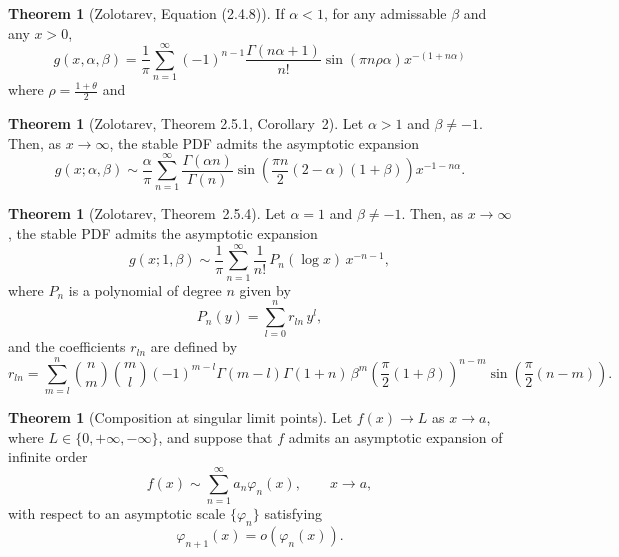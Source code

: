 \documentclass{article}
\theoremstyle{definition}
\newtheorem{appendixtheorem}[appendixdefinition]{Theorem}
\begin{document}
\begin{appendices}
\begin{appendixtheorem}[Zolotarev, Equation (2.4.8)]\label{th:series_expansion_1}
If \(\alpha<1\), for any admissable \(\beta\) and any \(x>0\),
\begin{equation}
    g(x,\alpha,\beta)=\frac{1}{\pi}\sum_{n=1}^\infty
    (-1)^{n-1}\frac{\Gamma(n\alpha+1)}{n!}
    \sin(\pi n\rho \alpha)x^{-(1+n\alpha)}
\end{equation}
where \(\rho=\frac{1+\theta}{2}\) and \(\)
\end{appendixtheorem}

\begin{appendixtheorem}[Zolotarev, Theorem 2.5.1, Corollary~2]\label{th:series_expansion_2}
Let \(\alpha>1\) and \(\beta\neq-1\). Then, as \(x\to\infty\), the stable PDF admits the asymptotic expansion
\begin{equation}
g(x;\alpha,\beta)
\sim
\frac{\alpha}{\pi}
\sum_{n=1}^{\infty}
\frac{\Gamma(\alpha n)}{\Gamma(n)}
\sin\!\left(\frac{\pi n}{2}(2-\alpha)(1+\beta)\right)
x^{-1-n\alpha}.
\label{eq:zolo_alpha_gt_1_asymptotic}
\end{equation}
\end{appendixtheorem}


\begin{appendixtheorem}[Zolotarev, Theorem~2.5.4]\label{th:series_expansion_3}
Let \(\alpha=1\) and \(\beta\neq-1\). Then, as \(x\to\infty\), the stable
PDF admits the asymptotic expansion
\begin{equation}
g(x;1,\beta)
\sim
\frac{1}{\pi}
\sum_{n=1}^{\infty}
\frac{1}{n!}\,P_n(\log x)\,x^{-n-1},
\label{eq:zolo_alpha1_asymptotic}
\end{equation}
where $P_n$ is a polynomial of degree $n$ given by
\begin{equation}
P_n(y)=\sum_{l=0}^{n} r_{l n}\, y^{l},
\end{equation}
and the coefficients $r_{l n}$ are defined by
\begin{equation}
r_{l n}
=
\sum_{m=l}^{n}
\binom{n}{m}\binom{m}{l}
(-1)^{m-l}
\Gamma(m-l)\Gamma(1+n)\,
\beta^{m}
\left(\frac{\pi}{2}(1+\beta)\right)^{n-m}
\sin\!\left(\frac{\pi}{2}(n-m)\right).
\end{equation}
\end{appendixtheorem}



\iffalse
\begin{appendixtheorem}[Composition at singular limit points]
Let $f(x)\to L$ as $x\to a$, where $L\in\{0,+\infty,-\infty\}$, and suppose that
$f$ admits an asymptotic expansion of infinite order
\[
f(x)\sim \sum_{n=1}^\infty a_n \varphi_n(x),
\qquad x\to a,
\]
with respect to an asymptotic scale $\{\varphi_n\}$ satisfying
\[
\varphi_{n+1}(x)=o(\varphi_n(x)).
\]


\end{appendixtheorem}
\end{appendices}
\end{document}
